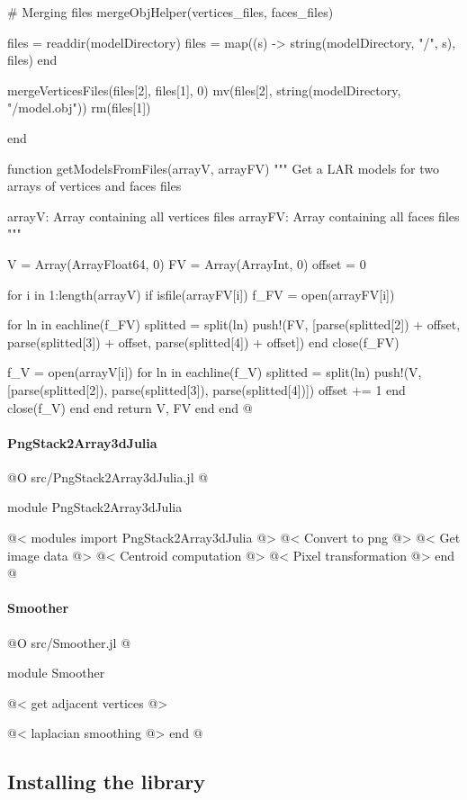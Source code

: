 \documentclass[11pt,oneside]{article}	%
\begin{document}
{    # Merging files
    mergeObjHelper(vertices_files, faces_files)

    files = readdir(modelDirectory)
    files = map((s) -> string(modelDirectory, "/", s), files)
  end

  mergeVerticesFiles(files[2], files[1], 0)
  mv(files[2], string(modelDirectory, "/model.obj"))
  rm(files[1])

end

function getModelsFromFiles(arrayV, arrayFV)
  """
  Get a LAR models for two arrays of vertices
  and faces files

  arrayV: Array containing all vertices files
  arrayFV: Array containing all faces files
  """

  V = Array(Array{Float64}, 0)
  FV = Array(Array{Int}, 0)
  offset = 0

  for i in 1:length(arrayV)
    if isfile(arrayFV[i])
      f_FV = open(arrayFV[i])

      for ln in eachline(f_FV)
        splitted = split(ln)
        push!(FV, [parse(splitted[2]) + offset, parse(splitted[3]) + offset, parse(splitted[4]) + offset])
      end
      close(f_FV)

      f_V = open(arrayV[i])
      for ln in eachline(f_V)
        splitted = split(ln)
        push!(V, [parse(splitted[2]), parse(splitted[3]), parse(splitted[4])])
        offset += 1
      end
      close(f_V)
    end
  end
  return V, FV
end
end
@}

\paragraph{PngStack2Array3dJulia}

@O src/PngStack2Array3dJulia.jl
@{module PngStack2Array3dJulia

@< modules import PngStack2Array3dJulia @>
@< Convert to png @>
@< Get image data @>
@< Centroid computation @>
@< Pixel transformation @>
end
@}

\paragraph{Smoother}

@O src/Smoother.jl
@{module Smoother

@< get adjacent vertices @>

@< laplacian smoothing @>
end
@}


\subsection{Installing the library}
\end{document}
